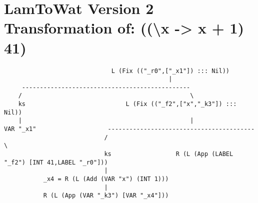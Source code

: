 \section{\label{section:v2printsimple}LamToWat Version 2 Transformation of: ((\textbackslash x -> x + 1) 41)}
\begin{landscape}
\begin{lstlisting}
                              L (Fix (("_r0",["_x1"]) ::: Nil))
                                              |
     -----------------------------------------------
    /                                               \
    ks                            L (Fix (("_f2",["x","_k3"]) ::: Nil))
    |                                               |
VAR "_x1"                    -----------------------------------------
                            /                                         \
                            ks                  R (L (App (LABEL "_f2") [INT 41,LABEL "_r0"]))
                            |
           _x4 = R (L (Add (VAR "x") (INT 1)))
                            |
           R (L (App (VAR "_k3") [VAR "_x4"]))

\end{lstlisting}
\end{landscape}
\clearpage


